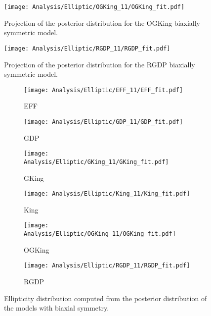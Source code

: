 \begin {figure}
 \centering
 \texttt{[image: Analysis/Elliptic/OGKing\_11/OGKing\_fit.pdf]}
  \caption{Projection of the posterior distribution for the OGKing biaxially symmetric model.}
\label{fig:OGKingEll}
\end {figure}

\begin {figure}
 \centering
 \texttt{[image: Analysis/Elliptic/RGDP\_11/RGDP\_fit.pdf]}
  \caption{Projection of the posterior distribution for the RGDP biaxially symmetric model.}
\label{fig:RGDPEll}
\end {figure}


\begin {figure}
\centering
\begin{subfigure}[t]{0.45\textwidth}
 \texttt{[image: Analysis/Elliptic/EFF\_11/EFF\_fit.pdf]}
 \caption{EFF}  
    \end{subfigure}
    \begin{subfigure}[t]{0.45\textwidth}
 \texttt{[image: Analysis/Elliptic/GDP\_11/GDP\_fit.pdf]}
 \caption{GDP}  
    \end{subfigure}
    \begin{subfigure}[t]{0.45\textwidth}
 \texttt{[image: Analysis/Elliptic/GKing\_11/GKing\_fit.pdf]}
 \caption{GKing}  
    \end{subfigure}
    \begin{subfigure}[t]{0.45\textwidth}
 \texttt{[image: Analysis/Elliptic/King\_11/King\_fit.pdf]}
 \caption{King}  
    \end{subfigure}
    \begin{subfigure}[t]{0.45\textwidth}
 \texttt{[image: Analysis/Elliptic/OGKing\_11/OGKing\_fit.pdf]}
 \caption{OGKing}  
    \end{subfigure}
        \begin{subfigure}[t]{0.45\textwidth}
 \texttt{[image: Analysis/Elliptic/RGDP\_11/RGDP\_fit.pdf]}
 \caption{RGDP}  
    \end{subfigure}
  \caption{Ellipticity distribution computed from the posterior distribution of the models with biaxial symmetry.}
\label{fig:ElliticityEll}
\end {figure}


